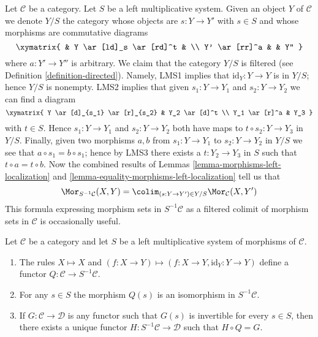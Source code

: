\begin{remark}
\label{remark-left-localization-morphisms-colimit}
Let $\mathcal{C}$ be a category. Let $S$ be a left multiplicative system.
Given an object $Y$ of $\mathcal{C}$ we denote $Y/S$ the category whose
objects are $s : Y \to Y'$ with $s \in S$ and whose morphisms are
commutative diagrams
$$
\xymatrix{
& Y \ar[ld]_s \ar[rd]^t & \\
Y' \ar[rr]^a & & Y''
}
$$
where $a : Y' \to Y''$ is arbitrary. We claim that the category
$Y/S$ is filtered (see
Definition \ref{definition-directed}).
Namely, LMS1 implies that $\text{id}_Y : Y \to Y$
is in $Y/S$; hence $Y/S$ is nonempty. LMS2 implies that given
$s_1 : Y \to Y_1$ and $s_2 : Y \to Y_2$ we can find a diagram
$$
\xymatrix{
Y \ar[d]_{s_1} \ar[r]_{s_2} & Y_2 \ar[d]^t \\
Y_1 \ar[r]^a & Y_3
}
$$
with $t \in S$. Hence $s_1 : Y \to Y_1$ and $s_2 : Y \to Y_2$
both have maps to $t \circ s_2 : Y \to Y_3$ in $Y/S$. Finally, given
two morphisms $a, b$ from $s_1 : Y \to Y_1$ to $s_2 : Y \to Y_2$
in $Y/S$ we see that $a \circ s_1 = b \circ s_1$; hence by LMS3
there exists a $t : Y_2 \to Y_3$ in $S$ such that
$t \circ a = t \circ b$.
Now the combined results of
Lemmas \ref{lemma-morphisms-left-localization} and
\ref{lemma-equality-morphisms-left-localization}
tell us that
\begin{equation}
\label{equation-left-localization-morphisms-colimit}
\Mor_{S^{-1}\mathcal{C}}(X, Y) =
\colim_{(s : Y \to Y') \in Y/S} \Mor_\mathcal{C}(X, Y')
\end{equation}
This formula expressing morphism sets in $S^{-1}\mathcal{C}$ as a filtered
colimit of morphism sets in $\mathcal{C}$ is occasionally useful.
\end{remark}

\begin{lemma}
\label{lemma-properties-left-localization}
Let $\mathcal{C}$ be a category and let $S$ be a left multiplicative
system of morphisms of $\mathcal{C}$.
\begin{enumerate}
\item The rules $X \mapsto X$ and
$(f : X \to Y) \mapsto (f : X \to Y, \text{id}_Y : Y \to Y)$
define a functor $Q : \mathcal{C} \to S^{-1}\mathcal{C}$.
\item For any $s \in S$ the morphism $Q(s)$ is an isomorphism in
$S^{-1}\mathcal{C}$.
\item If $G : \mathcal{C} \to \mathcal{D}$ is any functor such that
$G(s)$ is invertible for every $s \in S$, then there exists a
unique functor $H : S^{-1}\mathcal{C} \to \mathcal{D}$
such that $H \circ Q = G$.
\end{enumerate}
\end{lemma}

